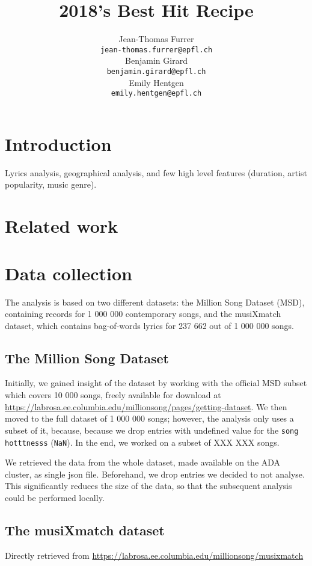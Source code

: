\documentclass[11pt]{article}
\title{2018's Best Hit Recipe}
\author{Jean-Thomas Furrer \\
  {\small\tt jean-thomas.furrer@epfl.ch} \\\And
  Benjamin Girard \\
  {\small\tt benjamin.girard@epfl.ch} \\\And
  Emily Hentgen \\
{\small\tt emily.hentgen@epfl.ch} \\}
\date{}
\renewcommand\_{\textunderscore\allowbreak}
\begin{document}
\maketitle
\begin{abstract}

\end{abstract}


\section{Introduction}


Lyrics analysis, geographical analysis, and few high level features (duration, artist popularity, music genre).

\section{Related work}

\section{Data collection}
The analysis is based on two different datasets: the Million Song Dataset (MSD), containing records for 1 000 000 contemporary songs, and the musiXmatch dataset, which contains bag-of-words lyrics for 237 662 out of 1 000 000 songs.

\subsection{The Million Song Dataset}
Initially, we gained insight of the dataset by working with the official MSD subset which covers 10 000 songs, freely available for download at \url{https://labrosa.ee.columbia.edu/millionsong/pages/getting-dataset}.
We then moved to the full dataset of 1 000 000 songs; however, the analysis only uses a subset of it, because, because we drop entries with undefined value for the \texttt{song hotttnesss} (\texttt{NaN}).
In the end, we worked on a subset of XXX XXX songs.

We retrieved the data from the whole dataset, made available on the ADA cluster, as single json file. Beforehand, we drop entries we decided to not analyse. 
This significantly reduces the size of the data, so that the subsequent analysis could be performed locally.

\subsection{The musiXmatch dataset}
Directly retrieved from \url{https://labrosa.ee.columbia.edu/millionsong/musixmatch}
\end{document}
